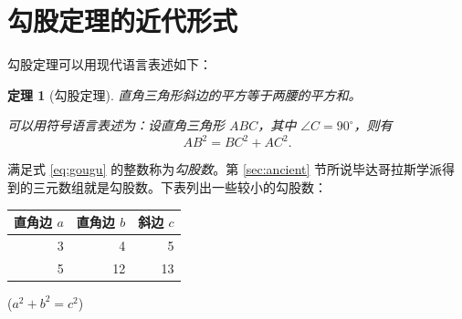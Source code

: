 \documentclass[UTF8]{ctexart}
\newtheorem{thm}{定理}
\newcommand\degree{^\circ}
\begin{document}
\section{勾股定理的近代形式}

勾股定理可以用现代语言表述如下：
\begin{thm}[勾股定理]
直角三角形斜边的平方等于两腰的平方和。

可以用符号语言表述为：设直角三角形 $ABC$，其中 $\angle C=90\degree$，则有
\begin{equation}\label{eq:gougu}
AB^2 = BC^2 + AC^2.
\end{equation}
\end{thm}

满足式 \eqref{eq:gougu} 的整数称为\emph{勾股数}。第 \ref{sec:ancient} 节所说毕达哥拉斯学派得到的三元数组就是勾股数。下表列出一些较小的勾股数：
\begin{table}[H]
\begin{tabular}{|rrr|}
\hline
直角边 $a$ & 直角边 $b$ & 斜边 $c$\\
\hline
3 & 4 & 5 \\
5 & 12 & 13 \\
\hline
\end{tabular}%
\qquad
($a^2 + b^2 = c^2$)
\end{table}

\nocite{Shiye}

\end{document}

